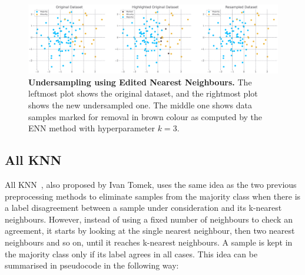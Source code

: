 \begin{figure}
    \centering
    \includegraphics[width=\linewidth]{figures/enn.eps}
    \caption{
        \textbf{Undersampling using Edited Nearest Neighbours.} The leftmost plot shows the
        original dataset, and the rightmost plot shows the new undersampled one. The middle one
        shows data samples marked for removal in brown colour as computed by the ENN method with
        hyperparameter $k = 3$.
    }
    \label{figure:enn}
\end{figure}


\subsection{All KNN}
\label{subsection:allknn}

All KNN~\cite{repeated-enn}, also proposed by Ivan Tomek, uses the same idea as the two previous
preprocessing methods to eliminate samples from the majority class when there is a label
disagreement between a sample under consideration and its k-nearest neighbours. However, instead of
using a fixed number of neighbours to check an agreement, it starts by looking at the single
nearest neighbour, then two nearest neighbours and so on, until it reaches k-nearest neighbours. A
sample is kept in the majority class only if its label agrees in all cases. This idea can be
summarised in pseudocode in the following way:

